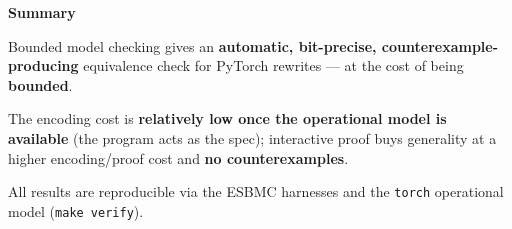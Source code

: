\documentclass[aspectratio=169,11pt]{beamer}
\begin{document}
{
\begin{frame}[plain]
  \centering\vfill
  {\Large\textcolor{accent}{\textbf{Summary}}}

  \bigskip
  Bounded model checking gives an \textbf{automatic, bit-precise, counterexample-producing}
  equivalence check for PyTorch rewrites --- at the cost of being \textbf{bounded}.

  \bigskip
  The encoding cost is \textbf{relatively low once the operational model is available} (the program
  acts as the spec); interactive proof buys generality at a higher encoding/proof cost and
  \textbf{no counterexamples}.

  \medskip
  {\footnotesize All results are reproducible via the ESBMC harnesses and the \texttt{torch}
  operational model (\texttt{make verify}).}
  \vfill
\end{frame}}
\end{document}
